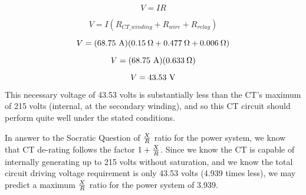 $$V = IR$$

$$V = I (R_{CT\_winding} + R_{wire} + R_{relay})$$

$$V = (68.75 \hbox{ A})(0.15 \> \Omega + 0.477 \> \Omega + 0.006 \> \Omega)$$

$$V = (68.75 \hbox{ A})(0.633 \> \Omega)$$

$$V = 43.53 \hbox{ V}$$

This necessary voltage of 43.53 volts is substantially less than the CT's maximum of 215 volts (internal, at the secondary winding), and so this CT circuit should perform quite well under the stated conditions.
 






In answer to the Socratic Question of $X \over R$ ratio for the power system, we know that CT de-rating follows the factor $1 + {X \over R}$.  Since we know the CT is capable of internally generating up to 215 volts without saturation, and we know the total circuit driving voltage requirement is only 43.53 volts (4.939 times less), we may predict a maximum $X \over R$ ratio for the power system of 3.939.




